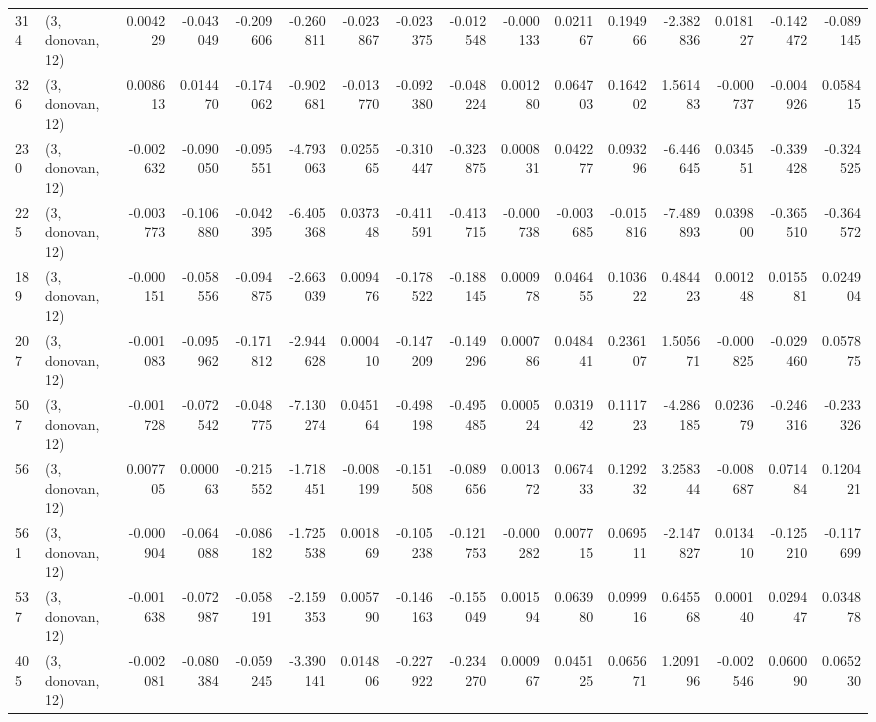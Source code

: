 \begin{tabular}{llrrrrrrrrrrrrrr}
314 &  (3, donovan, 12) &   0.004229 & -0.043049 & -0.209606 &   -0.260811 & -0.023867 &  -0.023375 &  -0.012548 & -0.000133 &  0.021167 &  0.194966 &   -2.382836 &  0.018127 &  -0.142472 &  -0.089145 \\
326 &  (3, donovan, 12) &   0.008613 &  0.014470 & -0.174062 &   -0.902681 & -0.013770 &  -0.092380 &  -0.048224 &  0.001280 &  0.064703 &  0.164202 &    1.561483 & -0.000737 &  -0.004926 &   0.058415 \\
230 &  (3, donovan, 12) &  -0.002632 & -0.090050 & -0.095551 &   -4.793063 &  0.025565 &  -0.310447 &  -0.323875 &  0.000831 &  0.042277 &  0.093296 &   -6.446645 &  0.034551 &  -0.339428 &  -0.324525 \\
225 &  (3, donovan, 12) &  -0.003773 & -0.106880 & -0.042395 &   -6.405368 &  0.037348 &  -0.411591 &  -0.413715 & -0.000738 & -0.003685 & -0.015816 &   -7.489893 &  0.039800 &  -0.365510 &  -0.364572 \\
189 &  (3, donovan, 12) &  -0.000151 & -0.058556 & -0.094875 &   -2.663039 &  0.009476 &  -0.178522 &  -0.188145 &  0.000978 &  0.046455 &  0.103622 &    0.484423 &  0.001248 &   0.015581 &   0.024904 \\
207 &  (3, donovan, 12) &  -0.001083 & -0.095962 & -0.171812 &   -2.944628 &  0.000410 &  -0.147209 &  -0.149296 &  0.000786 &  0.048441 &  0.236107 &    1.505671 & -0.000825 &  -0.029460 &   0.057875 \\
507 &  (3, donovan, 12) &  -0.001728 & -0.072542 & -0.048775 &   -7.130274 &  0.045164 &  -0.498198 &  -0.495485 &  0.000524 &  0.031942 &  0.111723 &   -4.286185 &  0.023679 &  -0.246316 &  -0.233326 \\
56  &  (3, donovan, 12) &   0.007705 &  0.000063 & -0.215552 &   -1.718451 & -0.008199 &  -0.151508 &  -0.089656 &  0.001372 &  0.067433 &  0.129232 &    3.258344 & -0.008687 &   0.071484 &   0.120421 \\
561 &  (3, donovan, 12) &  -0.000904 & -0.064088 & -0.086182 &   -1.725538 &  0.001869 &  -0.105238 &  -0.121753 & -0.000282 &  0.007715 &  0.069511 &   -2.147827 &  0.013410 &  -0.125210 &  -0.117699 \\
537 &  (3, donovan, 12) &  -0.001638 & -0.072987 & -0.058191 &   -2.159353 &  0.005790 &  -0.146163 &  -0.155049 &  0.001594 &  0.063980 &  0.099916 &    0.645568 &  0.000140 &   0.029447 &   0.034878 \\
405 &  (3, donovan, 12) &  -0.002081 & -0.080384 & -0.059245 &   -3.390141 &  0.014806 &  -0.227922 &  -0.234270 &  0.000967 &  0.045125 &  0.065671 &    1.209196 & -0.002546 &   0.060090 &   0.065230 \\

\end{tabular}
